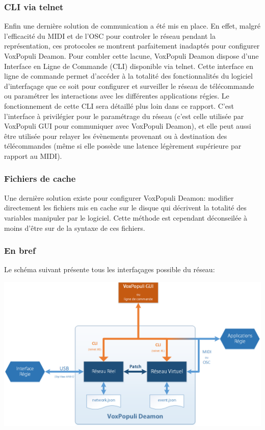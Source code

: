\documentclass{Rapport}
\begin{document}
\subsubsection*{CLI via telnet}

Enfin une dernière solution de communication  a été mis en place. En effet, malgré l'efficacité du MIDI et de l'OSC pour controler le réseau pendant la représentation, ces protocoles se montrent parfaitement inadaptés pour configurer VoxPopuli Deamon. Pour combler cette lacune, VoxPopuli Deamon dispose d'une Interface en Ligne de Commande (CLI) disponible via telnet. Cette interface en ligne de commande permet d'accéder à la totalité des fonctionnalités du logiciel d'interfaçage que ce soit pour configurer et surveiller le réseau de télécommande ou paramétrer les interactions avec les différentes applications régies. Le fonctionnement de cette CLI sera détaillé plus loin dans ce rapport. C'est l'interface à privilégier pour le paramétrage du réseau (c'est celle utilisée par VoxPopuli GUI pour communiquer avec VoxPopuli Deamon), et elle peut aussi être utilisée pour relayer les évènements provenant ou à destination des télécommandes (même si elle possède une latence légèrement supérieure par rapport au MIDI).

\subsubsection*{Fichiers de cache}

Une dernière solution existe pour configurer VoxPopuli Deamon: modifier directement les fichiers mis en cache sur le disque qui décrivent la totalité des variables manipuler par le logiciel. Cette méthode est cependant déconseilée à moins d'être sur de la syntaxe  de ces fichiers.

\subsubsection*{En bref}

Le schéma suivant présente tous les interfaçages possible du réseau:

\includegraphics[width=0.8\columnwidth]{rsc/diaGeneral}
\end{document}
